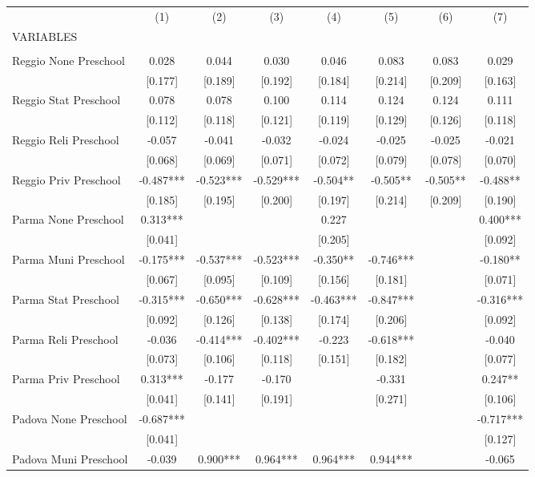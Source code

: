 \begin{tabular}{lccccccc} \hline
 & (1) & (2) & (3) & (4) & (5) & (6) & (7) \\
VARIABLES &  &  &  &  &  &  &  \\ \hline
 &  &  &  &  &  &  &  \\
Reggio None Preschool & 0.028 & 0.044 & 0.030 & 0.046 & 0.083 & 0.083 & 0.029 \\
 & [0.177] & [0.189] & [0.192] & [0.184] & [0.214] & [0.209] & [0.163] \\
Reggio Stat Preschool & 0.078 & 0.078 & 0.100 & 0.114 & 0.124 & 0.124 & 0.111 \\
 & [0.112] & [0.118] & [0.121] & [0.119] & [0.129] & [0.126] & [0.118] \\
Reggio Reli Preschool & -0.057 & -0.041 & -0.032 & -0.024 & -0.025 & -0.025 & -0.021 \\
 & [0.068] & [0.069] & [0.071] & [0.072] & [0.079] & [0.078] & [0.070] \\
Reggio Priv Preschool & -0.487*** & -0.523*** & -0.529*** & -0.504** & -0.505** & -0.505** & -0.488** \\
 & [0.185] & [0.195] & [0.200] & [0.197] & [0.214] & [0.209] & [0.190] \\
Parma None Preschool & 0.313*** &  &  & 0.227 &  &  & 0.400*** \\
 & [0.041] &  &  & [0.205] &  &  & [0.092] \\
Parma Muni Preschool & -0.175*** & -0.537*** & -0.523*** & -0.350** & -0.746*** &  & -0.180** \\
 & [0.067] & [0.095] & [0.109] & [0.156] & [0.181] &  & [0.071] \\
Parma Stat Preschool & -0.315*** & -0.650*** & -0.628*** & -0.463*** & -0.847*** &  & -0.316*** \\
 & [0.092] & [0.126] & [0.138] & [0.174] & [0.206] &  & [0.092] \\
Parma Reli Preschool & -0.036 & -0.414*** & -0.402*** & -0.223 & -0.618*** &  & -0.040 \\
 & [0.073] & [0.106] & [0.118] & [0.151] & [0.182] &  & [0.077] \\
Parma Priv Preschool & 0.313*** & -0.177 & -0.170 &  & -0.331 &  & 0.247** \\
 & [0.041] & [0.141] & [0.191] &  & [0.271] &  & [0.106] \\
Padova None Preschool & -0.687*** &  &  &  &  &  & -0.717*** \\
 & [0.041] &  &  &  &  &  & [0.127] \\
Padova Muni Preschool & -0.039 & 0.900*** & 0.964*** & 0.964*** & 0.944*** &  & -0.065 \\

\end{tabular}
